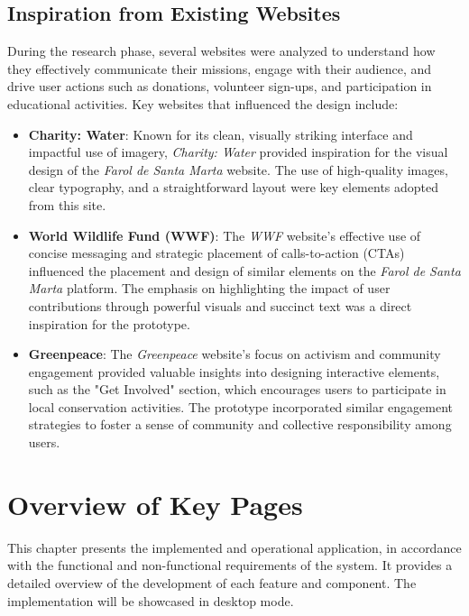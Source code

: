 \subsection{Inspiration from Existing Websites}

During the research phase, several websites were analyzed to understand how they effectively communicate their missions, engage with their audience, and drive user actions such as donations, volunteer sign-ups, and participation in educational activities. Key websites that influenced the design include:

\begin{itemize}
    \item \textbf{Charity: Water}: Known for its clean, visually striking interface and impactful use of imagery, \textit{Charity: Water} provided inspiration for the visual design of the \textit{Farol de Santa Marta} website. The use of high-quality images, clear typography, and a straightforward layout were key elements adopted from this site.

    \item \textbf{World Wildlife Fund (WWF)}: The \textit{WWF} website's effective use of concise messaging and strategic placement of calls-to-action (CTAs) influenced the placement and design of similar elements on the \textit{Farol de Santa Marta} platform. The emphasis on highlighting the impact of user contributions through powerful visuals and succinct text was a direct inspiration for the prototype.

    \item \textbf{Greenpeace}: The \textit{Greenpeace} website's focus on activism and community engagement provided valuable insights into designing interactive elements, such as the "Get Involved" section, which encourages users to participate in local conservation activities. The prototype incorporated similar engagement strategies to foster a sense of community and collective responsibility among users.
\end{itemize}

\section{Overview of Key Pages}

This chapter presents the implemented and operational application, in accordance with the functional and non-functional requirements of the system. It provides a detailed overview of the development of each feature and component. The implementation will be showcased in desktop mode.

